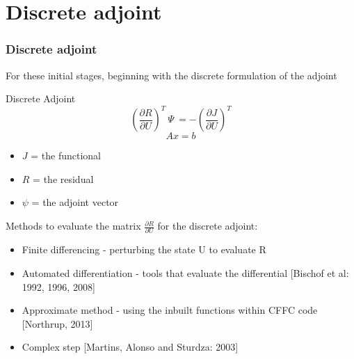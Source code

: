\documentclass{beamer}
\begin{document}

\section{Discrete adjoint}
\begin{frame}
\frametitle{Discrete adjoint}
\scriptsize
For these initial stages, beginning with the discrete formulation of the adjoint
\begin{minipage}[t][0.6\textheight]{1\textwidth}
\scriptsize
\vspace{-10pt}
\begin{exampleblock}{Discrete Adjoint}
\[\left( \frac{\partial{R}}{\partial{U}} \right)^T ~\Psi~ = -\left( \frac{\partial{J}}{\partial{U}} \right)^T\]
\vspace{-10pt}
\[Ax = b\]
\vspace{-10pt}
\vspace{10pt}
\begin{itemize}
\item \textbf{$J$} = the functional
\item \textbf{$R$} =  the residual
\item \textbf{$\psi$} = the adjoint vector
\end{itemize}
\end{exampleblock}
\end{minipage}

Methods to evaluate the matrix $\frac{\partial{R}}{\partial{U}} $  for the discrete adjoint:
\begin{itemize}
\scriptsize
\item Finite differencing - perturbing the state U to evaluate R 
\item Automated differentiation - tools that evaluate the differential [Bischof et al: 1992, 1996, 2008]
\item Approximate method  - using the inbuilt functions within CFFC code [Northrup, 2013]
\item Complex step [Martins, Alonso and Sturdza: 2003]
\end{itemize}


\end{frame}


\end{document}
